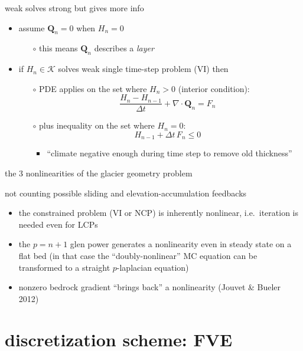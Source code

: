 \documentclass{beamer}
\newcommand\bQ{\mathbf{Q}}
\newcommand\Div{\nabla\cdot}
\begin{document}
\begin{frame}{weak solves strong but gives more info}

\begin{itemize}
  \item assume $\bQ_n=0$ when $H_n=0$
    \begin{itemize}
    \item[$\circ$] this means $\bQ_n$ describes a \emph{layer}
    \end{itemize}
  \item if $H_n \in \mathcal{K}$ solves weak single time-step problem (VI) then
  
      \medskip
	  \begin{itemize}
	  \item[$\circ$] PDE applies on the set where $H_n>0$ (interior condition):
	    $$\frac{H_n - H_{n-1}}{\Delta t} + \Div \bQ_n = F_n$$
	  \item[$\circ$] plus inequality on the set where $H_n = 0$:
	    $$H_{n-1} + \Delta t\, F_n \le 0$$
	    \vspace{-6mm}
	    \begin{itemize}
	    \item ``climate negative enough during time step to remove old thickness''
	    \end{itemize}
	  \end{itemize}
\end{itemize}
\end{frame}


\begin{frame}{the 3 nonlinearities of the glacier geometry problem}

not counting possible sliding and elevation-accumulation feedbacks
\begin{itemize}
\item the constrained problem (VI or NCP) is inherently nonlinear, i.e.~iteration is needed even for LCPs
\item the $p=n+1$ glen power generates a nonlinearity even in steady state on a flat bed (in that case the ``doubly-nonlinear'' MC equation can be transformed to a straight $p$-laplacian equation)
\item nonzero bedrock gradient ``brings back'' a nonlinearity (Jouvet \& Bueler 2012)
\end{itemize}
\end{frame}


\section{discretization scheme: FVE}
\end{document}
